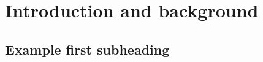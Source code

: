 \section{Introduction and background}
\label{sec:introduction}
\subsection{Example first subheading}











\FloatBarrier %




